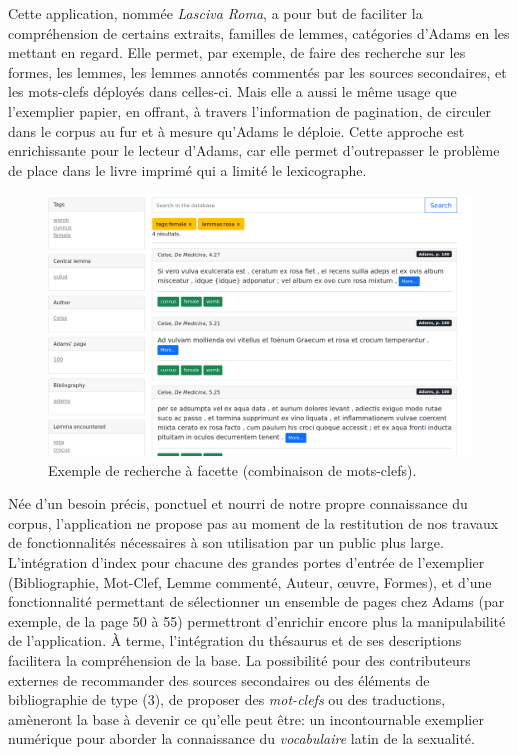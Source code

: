 Cette application, nommée \textit{Lasciva Roma}, a pour but de faciliter la compréhension de certains extraits, familles de lemmes, catégories d'Adams en les mettant en regard. Elle permet, par exemple, de faire des recherche sur les formes, les lemmes, les lemmes annotés commentés par les sources secondaires, et les mots-clefs déployés dans celles-ci. Mais elle a aussi le même usage que l'exemplier papier, en offrant, à travers l'information de pagination, de circuler dans le corpus au fur et à mesure qu'Adams le déploie. Cette approche est enrichissante pour le lecteur d'Adams, car elle permet d'outrepasser le problème de place dans le livre imprimé qui a limité le lexicographe.

\begin{figure}
    \centering
    \includegraphics[width=.8\linewidth]{figures/chap1/part3/exemplier/RechercheFacette.png}
    \caption{Exemple de recherche à facette (combinaison de mots-clefs).}
    \label{fig:exemplier:recherche}
\end{figure}

Née d'un besoin précis, ponctuel et nourri de notre propre connaissance du corpus, l'application ne propose pas au moment de la restitution de nos travaux de fonctionnalités nécessaires à son utilisation par un public plus large. L'intégration d'index pour chacune des grandes portes d'entrée de l'exemplier (Bibliographie, Mot-Clef, Lemme commenté, Auteur, œuvre, Formes), et d'une fonctionnalité permettant de sélectionner un ensemble de pages chez Adams (par exemple, de la page 50 à 55) permettront d'enrichir encore plus la manipulabilité de l'application. À terme, l'intégration du thésaurus et de ses descriptions facilitera la compréhension de la base. La possibilité pour des contributeurs externes de recommander des sources secondaires ou des éléments de bibliographie de type (3), de proposer des \textit{mot-clefs} ou des traductions, amèneront la base à devenir ce qu'elle peut être: un incontournable exemplier numérique pour aborder la connaissance du \textit{vocabulaire} latin de la sexualité.

